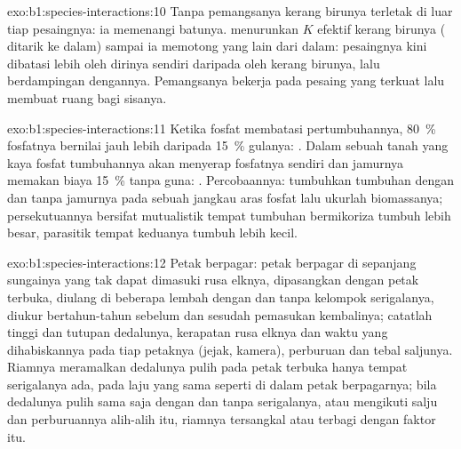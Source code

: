 \begin{solution}{exo:b1:species-interactions:10}
Tanpa pemangsanya  kerang birunya terletak di luar  tiap
pesaingnya: ia memenangi batunya.  menurunkan $K$ efektif
kerang birunya ( ditarik ke dalam) sampai ia memotong
 yang lain dari dalam: pesaingnya kini dibatasi lebih oleh
dirinya sendiri daripada oleh kerang birunya, lalu berdampingan
dengannya. Pemangsanya bekerja pada pesaing yang terkuat lalu membuat
ruang bagi sisanya.
\end{solution}

\begin{solution}{exo:b1:species-interactions:11}
Ketika fosfat membatasi pertumbuhannya, \qty{80}{\%} fosfatnya bernilai
jauh lebih daripada \qty{15}{\%} gulanya: . Dalam sebuah
tanah yang kaya fosfat tumbuhannya akan menyerap fosfatnya sendiri dan
jamurnya memakan biaya \qty{15}{\%} tanpa guna: .
Percobaannya: tumbuhkan tumbuhan dengan dan tanpa jamurnya pada
sebuah jangkau aras fosfat lalu ukurlah biomassanya; persekutuannya
bersifat mutualistik tempat tumbuhan bermikoriza tumbuh lebih besar,
parasitik tempat keduanya tumbuh lebih kecil.
\end{solution}

\begin{solution}{exo:b1:species-interactions:12}
Petak berpagar: petak berpagar di sepanjang sungainya yang tak dapat
dimasuki rusa elknya, dipasangkan dengan petak terbuka, diulang di
beberapa lembah dengan dan tanpa kelompok serigalanya, diukur
bertahun-tahun sebelum dan sesudah pemasukan kembalinya; catatlah
tinggi dan tutupan dedalunya, kerapatan rusa elknya dan waktu yang
dihabiskannya pada tiap petaknya (jejak, kamera), perburuan dan tebal
saljunya. Riamnya meramalkan dedalunya pulih pada petak terbuka hanya
tempat serigalanya ada, pada laju yang sama seperti di dalam petak
berpagarnya; bila dedalunya pulih sama saja dengan dan tanpa
serigalanya, atau mengikuti salju dan perburuannya alih-alih itu,
riamnya tersangkal atau terbagi dengan faktor itu.
\end{solution}

